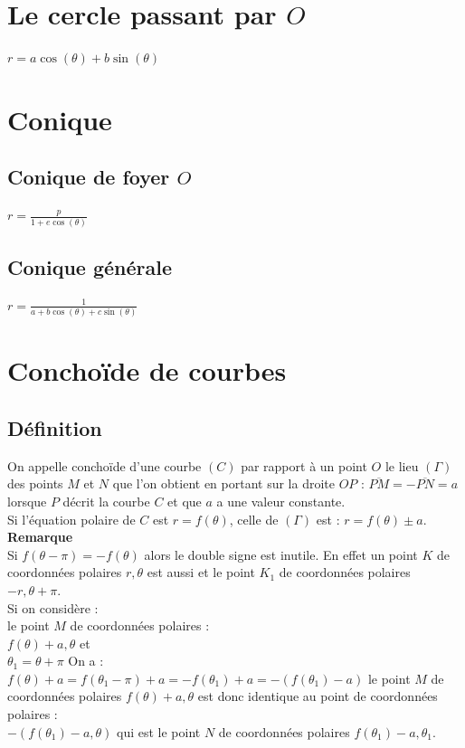 \documentclass[a4paper,11pt]{book}
\begin{document}
\section{Le cercle passant par $O$}
$r=a\cos(\theta)+b\sin(\theta)$
\section{Conique}
\subsection{Conique de foyer $O$}
$\displaystyle r=\frac{p}{1+e\cos(\theta)}$
\subsection{Conique g\'en\'erale}
$\displaystyle r=\frac{1}{a+b\cos(\theta)+c\sin(\theta)}$
\section{Concho\"{i}de de courbes}
\subsection{D\'efinition}
On appelle concho\"{i}de d'une courbe $(C)$ par rapport \`a un point $O$ le 
lieu $(\Gamma)$ des points $M$ et $N$ que l'on obtient en portant sur la 
droite $OP$ : $\overline{PM}=-\overline{PN}=a$ lorsque $P$ d\'ecrit la courbe 
$C$ et que $a$ a une valeur constante.\\
Si l'\'equation polaire de $C$ est $r=f(\theta)$, celle de $(\Gamma)$ est :
$r=f(\theta)\pm a$.\\
{\bf Remarque}\\
Si $f(\theta-\pi)=-f(\theta)$ alors le double signe est inutile. En effet 
un point $K$ de coordonn\'ees polaires $r,\theta$ est aussi 
et le point $K_1$ de coordonn\'ees polaires $-r,\theta+\pi$.\\
Si on consid\`ere :\\
le point $M$ de coordonn\'ees polaires :\\
$f(\theta)+a,\theta$  et \\
$\theta_1=\theta+\pi$
On a :\\
$f(\theta)+a=f(\theta_1-\pi)+a=-f(\theta_1)+a=-(f(\theta_1)-a)$
le point $M$  de coordonn\'ees polaires $f(\theta)+a,\theta$
est donc identique au point de coordonn\'ees polaires :\\
$-(f(\theta_1)-a,\theta)$ qui est le  point  $N$ de coordonn\'ees 
polaires $f(\theta_1)-a,\theta_1$.
\end{document}
